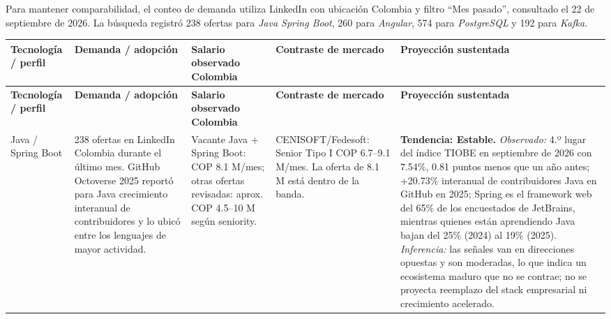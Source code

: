 \documentclass[12pt,a4paper]{article}
\begin{document}
Para mantener comparabilidad, el conteo de demanda utiliza LinkedIn con ubicación Colombia y filtro ``Mes pasado'', consultado el 22 de septiembre de 2026. La búsqueda registró 238 ofertas para \textit{Java Spring Boot}, 260 para \textit{Angular}, 574 para \textit{PostgreSQL} y 192 para \textit{Kafka}. \cite{linkedin-java-spring-jobs,linkedin-angular-jobs,linkedin-postgresql-jobs,linkedin-kafka-jobs}

\scriptsize
\setlength{\tabcolsep}{2.5pt}
\begin{longtable}{P{0.10\textwidth} P{0.15\textwidth} P{0.14\textwidth} P{0.19\textwidth} P{0.20\textwidth}}
\toprule
\textbf{Tecnología / perfil} & \textbf{Demanda / adopción} & \textbf{Salario observado Colombia} & \textbf{Contraste de mercado} & \textbf{Proyección sustentada} \\
\midrule
\endfirsthead
\toprule
\textbf{Tecnología / perfil} & \textbf{Demanda / adopción} & \textbf{Salario observado Colombia} & \textbf{Contraste de mercado} & \textbf{Proyección sustentada} \\
\midrule
\endhead
Java / Spring Boot & 238 ofertas en LinkedIn Colombia durante el último mes. GitHub Octoverse 2025 reportó para Java crecimiento interanual de contribuidores y lo ubicó entre los lenguajes de mayor actividad. \cite{linkedin-java-spring-jobs,github-octoverse} & Vacante Java + Spring Boot: COP 8.1 M/mes; otras ofertas revisadas: aprox. COP 4.5--10 M según seniority. \cite{job-java-81,job-java-kafka} & CENISOFT/Fedesoft: Senior Tipo I COP 6.7--9.1 M/mes. La oferta de 8.1 M está dentro de la banda. \cite{cenisoft-talento-digital} & \textbf{Tendencia: Estable.} \textit{Observado:} 4.º lugar del índice TIOBE en septiembre de 2026 con 7.54\%, 0.81 puntos menos que un año antes; +20.73\% interanual de contribuidores Java en GitHub en 2025; Spring es el framework web del 65\% de los encuestados de JetBrains, mientras quienes están aprendiendo Java bajan del 25\% (2024) al 19\% (2025). \cite{tiobe-2026,github-octoverse,jetbrains-java-2025} \textit{Inferencia:} las señales van en direcciones opuestas y son moderadas, lo que indica un ecosistema maduro que no se contrae; no se proyecta reemplazo del stack empresarial ni crecimiento acelerado. \\

\end{longtable}
\end{document}
